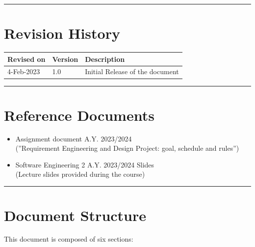 \documentclass{Configuration_Files/Template}
\begin{document}
{\color{bluepoli}\rule{\linewidth}{0.1pt}}

\section{Revision History}

\noindent
\begin{tabularx}{\textwidth}{llX}
    \toprule
    Revised on & Version & Description \\
    \midrule
    4-Feb-2023 & 1.0 & Initial Release of the document \\
    \bottomrule
\end{tabularx}
\vspace{0.33pt}

{\color{bluepoli}\rule{\linewidth}{0.1pt}}

\section{Reference Documents}

\begin{itemize}
\item \textcolor{bluepoli}{Assignment document A.Y. 2023/2024}\\
(”Requirement Engineering and Design Project: goal, schedule and rules”)
\item \textcolor{bluepoli}{Software Engineering 2 A.Y. 2023/2024 Slides}\\
(Lecture slides provided during the course)
\end{itemize}

{\color{bluepoli}\rule{\linewidth}{0.1pt}}

\section{Document Structure}

This document is composed of six sections:
\end{document}
